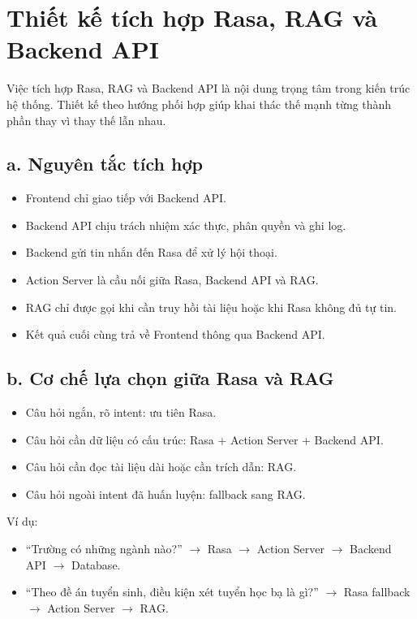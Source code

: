 ﻿\section{Thiết kế tích hợp Rasa, RAG và Backend API}

Việc tích hợp Rasa, RAG và Backend API là nội dung trọng tâm trong kiến trúc hệ thống. Thiết kế theo hướng phối hợp giúp khai thác thế mạnh từng thành phần thay vì thay thế lẫn nhau.

\subsection*{a. Nguyên tắc tích hợp}

\begin{itemize}
    \item Frontend chỉ giao tiếp với Backend API.
    \item Backend API chịu trách nhiệm xác thực, phân quyền và ghi log.
    \item Backend gửi tin nhắn đến Rasa để xử lý hội thoại.
    \item Action Server là cầu nối giữa Rasa, Backend API và RAG.
    \item RAG chỉ được gọi khi cần truy hồi tài liệu hoặc khi Rasa không đủ tự tin.
    \item Kết quả cuối cùng trả về Frontend thông qua Backend API.
\end{itemize}

\subsection*{b. Cơ chế lựa chọn giữa Rasa và RAG}

\begin{itemize}
    \item Câu hỏi ngắn, rõ intent: ưu tiên Rasa.
    \item Câu hỏi cần dữ liệu có cấu trúc: Rasa + Action Server + Backend API.
    \item Câu hỏi cần đọc tài liệu dài hoặc cần trích dẫn: RAG.
    \item Câu hỏi ngoài intent đã huấn luyện: fallback sang RAG.
\end{itemize}

Ví dụ:
\begin{itemize}
    \item ``Trường có những ngành nào?'' $\rightarrow$ Rasa $\rightarrow$ Action Server $\rightarrow$ Backend API $\rightarrow$ Database.
    \item ``Theo đề án tuyển sinh, điều kiện xét tuyển học bạ là gì?'' $\rightarrow$ Rasa fallback $\rightarrow$ Action Server $\rightarrow$ RAG.
\end{itemize}

